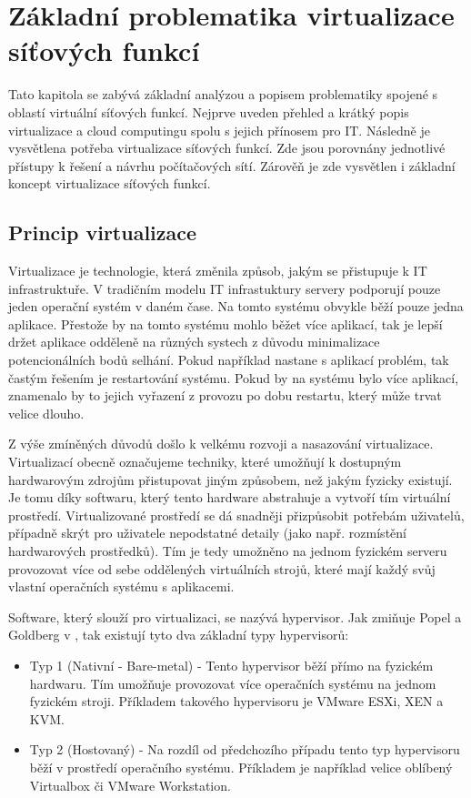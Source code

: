 \chapter{Základní problematika virtualizace síťových funkcí}

Tato kapitola se zabývá základní analýzou a popisem problematiky spojené s oblastí virtuální síťových funkcí. Nejprve uveden přehled a krátký popis virtualizace a cloud computingu spolu s jejich přínosem pro IT. Následně je vysvětlena potřeba virtualizace síťových funkcí. Zde jsou porovnány jednotlivé přístupy k řešení a návrhu počítačových sítí. Zárověň je zde vysvětlen i základní koncept virtualizace síťových funkcí.

\section{Princip virtualizace}

Virtualizace je technologie, která změnila způsob, jakým se přistupuje k IT infrastruktuře. V tradičním modelu IT infrastuktury servery podporují pouze jeden operační systém v daném čase. Na tomto systému obvykle běží pouze jedna aplikace. Přestože by na tomto systému mohlo běžet více aplikací, tak je lepší držet aplikace odděleně na různých systech z důvodu minimalizace potencionálních bodů selhání. Pokud například nastane s aplikací problém, tak častým řešením je restartování systému. Pokud by na systému bylo více aplikací, znamenalo by to jejich vyřazení z provozu po dobu restartu, který může trvat velice dlouho. \cite{VM_book}

Z výše zmíněných důvodů došlo k velkému rozvoji a nasazování virtualizace. Virtualizací obecně označujeme techniky, které umožňují k dostupným hardwarovým zdrojům přistupovat jiným způsobem, než jakým fyzicky existují. Je tomu díky softwaru, který tento hardware abstrahuje a vytvoří tím virtuální prostředí. Virtualizované prostředí se dá snadněji přizpůsobit potřebám uživatelů, případně skrýt pro uživatele nepodstatné detaily (jako např. rozmístění hardwarových prostředků). Tím je tedy umožněno na jednom fyzickém serveru provozovat více od sebe oddělených virtuálních strojů, které mají každý svůj vlastní operačních systému s aplikacemi.

Software, který slouží pro virtualizaci, se nazývá hypervisor. Jak zmiňuje Popel a Goldberg v \cite{VM_architektura}, tak existují tyto dva základní typy hypervisorů:

\begin{itemize}
\item Typ 1 (Nativní - Bare-metal) - Tento hypervisor běží přímo na fyzickém hardwaru. Tím umožňuje provozovat více operačních systému na jednom fyzickém stroji. Příkladem takového hypervisoru je VMware ESXi, XEN a KVM.
\item Typ 2 (Hostovaný) - Na rozdíl od předchozího případu tento typ hypervisoru běží v prostředí operačního systému. Příkladem je například velice oblíbený Virtualbox či VMware Workstation.
\end{itemize}

